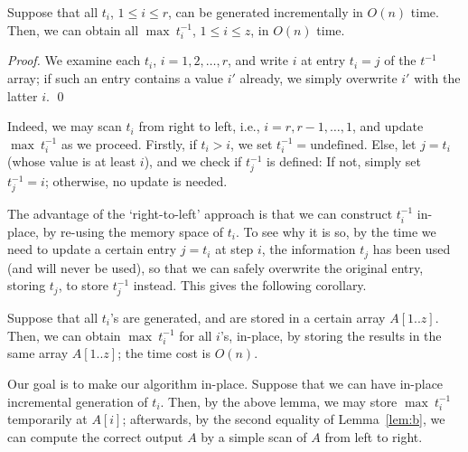 \documentclass[11pt]{llncs}
\begin{document}
\begin{lemma}
Suppose that all $t_i$, $1\leq i\leq r$, can be 
generated incrementally in $O(n)$ time.  
Then, we can obtain all $\max\ t_i^{-1}$, $1\leq i\leq z$, 
in $O(n)$ time.
\end{lemma}

\begin{proof}
  We examine each $t_i$, $i=1,2,\ldots,r$, and write $i$
  at entry $t_i = j$ of
  the $t^{-1}$ array; if such an entry contains a value $i'$ already,
  we simply overwrite $i'$ with the latter $i$. \qed
\end{proof}

\noindent
Indeed, we may scan $t_i$ from right to left, i.e., $i=r,r-1,\ldots,
1$, and update $\max\ t_i^{-1}$ as we proceed. Firstly, if $t_i > i$,
we set $t_i^{-1} = \mbox{undefined}$. Else, let $j = t_i$ (whose value
is at least $i$), and we check if $t^{-1}_{j}$ is defined: If not,
simply set $t^{-1}_j = i$; otherwise, no update is needed.

\smallskip

\noindent
The advantage of the `right-to-left' approach is that we can construct
$t_i^{-1}$ in-place, by re-using the memory space of $t_i$.  To see
why it is so, by the time we need to update a certain entry $j = t_i$
at step $i$, the information $t_j$ has been used (and will never be
used), so that we can safely overwrite the original entry, storing
$t_j$, to store $t_j^{-1}$ instead.  This gives the following
corollary.

\begin{corollary}
\label{cor:t}
  Suppose that all $t_i$'s are generated, and are stored in a certain array
  $A[1..z]$. Then, we can obtain $\max\ t_i^{-1}$ for all $i$'s,
  in-place,
  by storing the results in the same array $A[1..z]$; the time cost is
  $O(n)$.
\end{corollary}
 

\noindent
Our goal is to make our algorithm in-place. Suppose that we can have
in-place incremental generation of $t_i$. Then, by the above lemma, we
may store $\max\ t_i^{-1}$ temporarily at $A[i]$; afterwards, by the
second equality of Lemma~\ref{lem:b}, we can compute the correct
output $A$ by a simple scan of $A$ from left to right.
\end{document}

